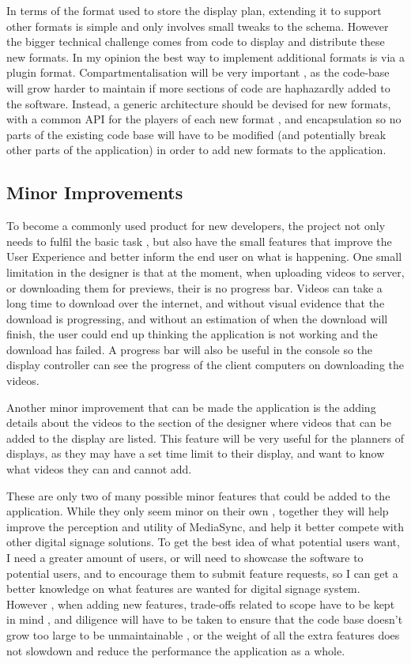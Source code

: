 \documentclass{article}
\begin{document}
In terms of the format used to store the display plan, extending it to support other formats is simple and only involves small tweaks to the schema. However the bigger technical challenge comes from code to display and distribute these new formats. In my opinion the best way to implement additional formats is via a plugin format. Compartmentalisation will be very important , as the code-base will grow harder to maintain if more sections of code are haphazardly added to the software. Instead, a generic architecture should be devised for new formats, with a common API for the players of each new format , and encapsulation  so no parts of the existing code base will have to be modified (and potentially break other parts of the application) in order to add new formats to the application. 

\subsection{Minor Improvements}
To become a commonly used product for new developers, the project not only needs to fulfil the basic task , but also have the small features that improve the User Experience and better inform the end user on what is happening. One small limitation in the designer is that at the moment, when uploading videos to server, or downloading them for previews, their is no progress bar. Videos can take a long time to download over the internet, and without visual evidence that the download is progressing, and without an estimation of when the download will finish, the user could end up thinking the application is not working and the download has failed. A progress bar will also be useful in the console so the display controller can see the progress of the client computers on downloading the videos.

Another minor improvement that can be made the application is the adding details about the videos to the section of the designer where videos that can be added to the display are listed. This feature will be very useful for the planners of displays, as they may have a set time limit to their display, and want to know what videos they can and cannot add.

These are only two of many possible minor features that could be added to the application. While they only seem minor on their own , together they will help improve the perception and utility of MediaSync, and help it better compete with other digital signage solutions. To get the best idea of what potential users want, I need a greater amount of users, or will need to showcase the software to potential users, and to encourage them to submit feature requests, so I can get a better knowledge on what features are wanted for digital signage system. However , when adding new features, trade-offs related to scope have to be kept in mind , and diligence will have to be taken to ensure that the code base doesn't grow too large to be unmaintainable , or the weight of all the extra features does not slowdown and reduce the performance the application as a whole. 
\end{document}
